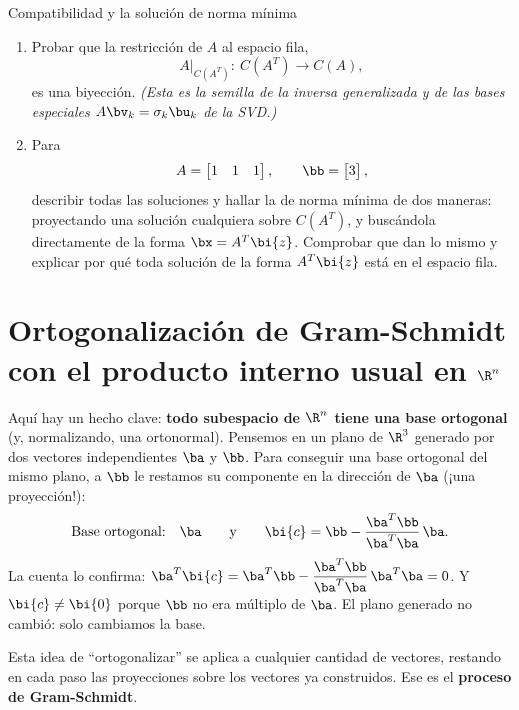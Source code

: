 \begin{entrega}{Compatibilidad y la solución de norma mínima}
\begin{enumerate}[label=\textbf{(\alph*)},itemsep=3pt,topsep=4pt]
\item Probar que la restricción de $A$ al espacio fila,
\[
A\big|_{C(A^T)}:\ C(A^T)\longrightarrow C(A),
\]
es una biyección. \emph{(Esta es la semilla de la inversa generalizada y de
las bases especiales $A\bv_k=\sigma_k\bu_k$ de la SVD.)}

\item Para
\[
A=\begin{bmatrix}1&1&1\end{bmatrix},\qquad \bb=\begin{bmatrix}3\end{bmatrix},
\]
describir todas las soluciones y hallar la de norma mínima de dos maneras:
proyectando una solución cualquiera sobre $C(A^T)$, y buscándola
directamente de la forma $\bx=A^T\bi{z}$. Comprobar que dan lo mismo y
explicar por qué toda solución de la forma $A^T\bi{z}$ está en el espacio
fila.
\end{enumerate}

\medskip
{}
\end{entrega}

\section{Ortogonalización de Gram-Schmidt con el producto interno usual en $\R^n$}\label{sec:gram-schmidt}

Aquí hay un hecho clave: \textbf{todo subespacio de $\R^n$ tiene una base
ortogonal} (y, normalizando, una ortonormal). Pensemos en un plano de $\R^3$
generado por dos vectores independientes $\ba$ y $\bb$. Para conseguir una
base ortogonal del mismo plano, a $\bb$ le restamos su componente en la
dirección de $\ba$ (¡una proyección!):
\begin{equation}\label{eq:gs-idea}
\text{Base ortogonal:}\quad \ba
\qquad\text{y}\qquad
\bi{c}=\bb-\frac{\ba^T\bb}{\ba^T\ba}\,\ba .
\end{equation}
La cuenta lo confirma:
$\ba^T\bi{c}=\ba^T\bb-\dfrac{\ba^T\bb}{\ba^T\ba}\,
\ba^T\ba=0$. Y $\bi{c}\ne\bi{0}$ porque $\bb$ no era múltiplo de $\ba$.
El plano generado no cambió: solo cambiamos la base.

Esta idea de ``ortogonalizar'' se aplica a cualquier cantidad de vectores,
restando en cada paso las proyecciones sobre los vectores ya construidos.
Ese es el \textbf{proceso de Gram-Schmidt}.

